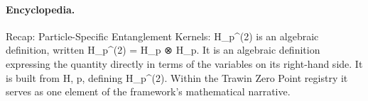\paragraph{Encyclopedia.}
Recap: Particle-Specific Entanglement Kernels: H\_p\textasciicircum{}(2) is an algebraic definition, written H\_p\textasciicircum{}(2) = H\_p ⊗ H\_p. It is an algebraic definition expressing the quantity directly in terms of the variables on its right-hand side. It is built from H, p, defining H\_p\textasciicircum{}(2). Within the Trawin Zero Point registry it serves as one element of the framework's mathematical narrative.
